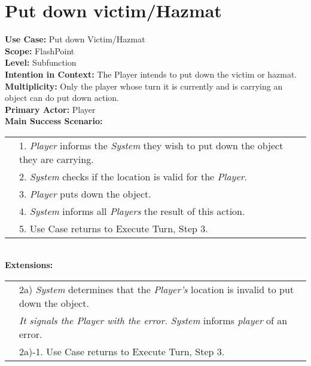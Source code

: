 \documentclass{article}
\begin{document}
	\section*{Put down victim/Hazmat}
	\textbf{Use Case:} Put down Victim/Hazmat\\
	\textbf{Scope:} FlashPoint\\
	\textbf{Level:} Subfunction\\
	\textbf{Intention in Context:} The Player intends to put down the victim or hazmat.\\
	\textbf{Multiplicity:} Only the player whose turn it is currently and is carrying an object can do put down action.\\
	\textbf{Primary Actor:} Player\\
	\textbf{Main Success Scenario:}\\
	\begin{tabular}{l l}
		&1. \textit{Player} informs the \textit{System} they wish to put down the object they are carrying.\\
		&2. \textit{System} checks if the location is valid for the \textit{Player}.\\
		&3. \textit{Player} puts down the object.\\
		&4. \textit{System} informs all \textit{Players} the result of this action.\\
		&5. Use Case returns to Execute Turn, Step 3.
	\end{tabular}\\
	\textbf{Extensions:}\\
	\begin{tabular}{l l}
		&2a) \textit{System} determines that the \textit{Player’s} location is invalid to put down the object.\\
		&\qquad\textit{It signals the Player with the error.} \textit{System} informs \textit{player} of an error.\\
		&\qquad2a)-1. Use Case returns to Execute Turn, Step 3.
	\end{tabular}
\end{document}
